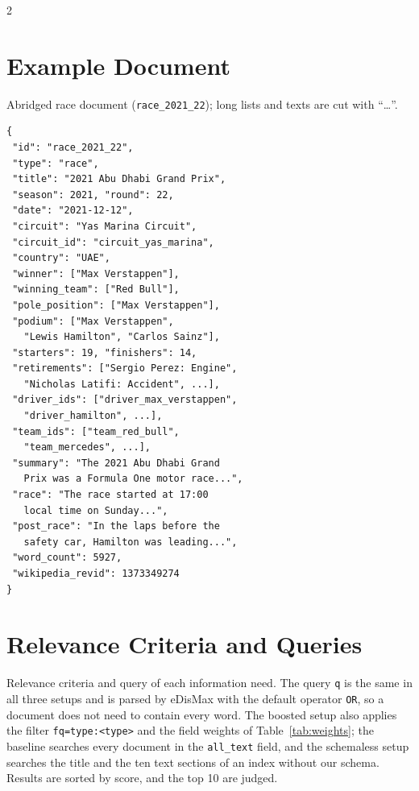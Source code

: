 \documentclass[sigconf]{acmart}
\begin{document}
\onecolumn
\raggedbottom
\appendix
\begin{multicols}{2}



\columnbreak
\setcounter{section}{0}

\section{Example Document}
\label{sec:example}
Abridged race document (\texttt{race\_2021\_22}); long lists and texts are
cut with ``\ldots''.

{\footnotesize
\begin{verbatim}
{
 "id": "race_2021_22",
 "type": "race",
 "title": "2021 Abu Dhabi Grand Prix",
 "season": 2021, "round": 22,
 "date": "2021-12-12",
 "circuit": "Yas Marina Circuit",
 "circuit_id": "circuit_yas_marina",
 "country": "UAE",
 "winner": ["Max Verstappen"],
 "winning_team": ["Red Bull"],
 "pole_position": ["Max Verstappen"],
 "podium": ["Max Verstappen",
   "Lewis Hamilton", "Carlos Sainz"],
 "starters": 19, "finishers": 14,
 "retirements": ["Sergio Perez: Engine",
   "Nicholas Latifi: Accident", ...],
 "driver_ids": ["driver_max_verstappen",
   "driver_hamilton", ...],
 "team_ids": ["team_red_bull",
   "team_mercedes", ...],
 "summary": "The 2021 Abu Dhabi Grand
   Prix was a Formula One motor race...",
 "race": "The race started at 17:00
   local time on Sunday...",
 "post_race": "In the laps before the
   safety car, Hamilton was leading...",
 "word_count": 5927,
 "wikipedia_revid": 1373349274
}
\end{verbatim}
}
\end{multicols}

\section{Relevance Criteria and Queries}
\label{sec:criteria}
Relevance criteria and query of each information need. The query \texttt{q}
is the same in all three setups and is parsed by eDisMax with the default
operator \texttt{OR}, so a document does not need to contain every word. The
boosted setup also applies the filter \texttt{fq=type:<type>} and the field
weights of Table~\ref{tab:weights}; the baseline searches every document in
the \texttt{all\_text} field, and the schemaless setup searches the title and
the ten text sections of an index without our schema. Results are sorted by score, and the top 10 are
judged.
\end{document}
